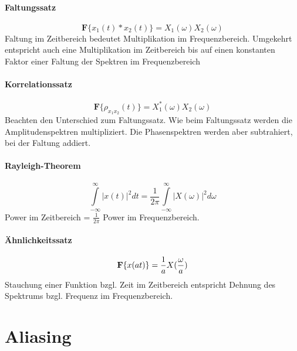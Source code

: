 \paragraph{Faltungssatz} 
\begin{equation}
\textbf{F} \{x_1(t) \ast x_2(t)\}= X_1(\omega) X_2(\omega)
\end{equation}
Faltung im Zeitbereich bedeutet Multiplikation im Frequenzbereich. Umgekehrt entspricht auch eine Multiplikation im Zeitbereich bis auf einen konstanten Faktor einer Faltung der Spektren im Frequenzbereich

\paragraph{Korrelationssatz}
\begin{equation}
\textbf{F} \{\rho_{x_1x_2}(t)\}= X_1^\ast(\omega) X_2(\omega)
\end{equation}
Beachten den Unterschied zum Faltungssatz. Wie beim Faltungssatz werden die Amplitudenspektren multipliziert. Die Phasenspektren werden aber subtrahiert, bei der Faltung addiert.

\paragraph{Rayleigh-Theorem}
\begin{equation}
\int\limits_{-\infty}^{\infty} | x(t) |^2 dt = \frac{1}{2\pi} \int\limits_{-\infty}^{\infty} | X(\omega)|^2 d\omega
\end{equation}
Power im Zeitbereich = $\frac{1}{2\pi}$ Power im Frequenzbereich.

\paragraph{Ähnlichkeitssatz}
\begin{equation}
{\bf F} \{x(at)\}= \frac{1}{a} X(\frac{\omega}{a})
\end{equation}
Stauchung einer Funktion bzgl. Zeit im Zeitbereich entspricht Dehnung des Spektrums bzgl. Frequenz im Frequenzbereich.


\section{Aliasing}

